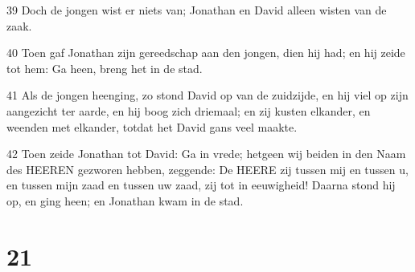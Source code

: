 \par 39 Doch de jongen wist er niets van; Jonathan en David alleen wisten van de zaak.
\par 40 Toen gaf Jonathan zijn gereedschap aan den jongen, dien hij had; en hij zeide tot hem: Ga heen, breng het in de stad.
\par 41 Als de jongen heenging, zo stond David op van de zuidzijde, en hij viel op zijn aangezicht ter aarde, en hij boog zich driemaal; en zij kusten elkander, en weenden met elkander, totdat het David gans veel maakte.
\par 42 Toen zeide Jonathan tot David: Ga in vrede; hetgeen wij beiden in den Naam des HEEREN gezworen hebben, zeggende: De HEERE zij tussen mij en tussen u, en tussen mijn zaad en tussen uw zaad, zij tot in eeuwigheid! Daarna stond hij op, en ging heen; en Jonathan kwam in de stad.

\chapter{21}

